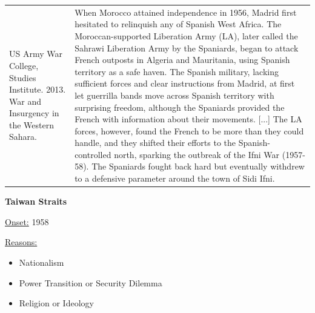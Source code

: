 {\begin{longtable}{p{}p{}}
US Army War College, Studies Institute. 2013. War and Insurgency in the Western Sahara. & When Morocco attained independence in 1956, Madrid first hesitated to relinquish any of Spanish West Africa. The Moroccan-supported Liberation Army (LA), later called the Sahrawi Liberation Army by the Spaniards, began to attack French outposts in Algeria and Mauritania, using Spanish territory as a safe haven. The Spanish military, lacking sufficient forces and clear instructions from Madrid, at first let guerrilla bands move across Spanish territory with surprising freedom, although the Spaniards provided the French with information about their movements. [...] The LA forces, however, found the French to be more than they could handle, and they shifted their efforts to the Spanish-controlled north, sparking the outbreak of the Ifni War (1957-58). The Spaniards fought back hard but eventually withdrew to a defensive parameter around the town of Sidi Ifni.
\\
\end{longtable}}
\clearpage
         \textbf{Taiwan Straits} 

          \underline{Onset:} 1958         

\underline{Reasons:}
\begin{itemize}
\item Nationalism
\item Power Transition or Security Dilemma
\item Religion or Ideology
\end{itemize}

